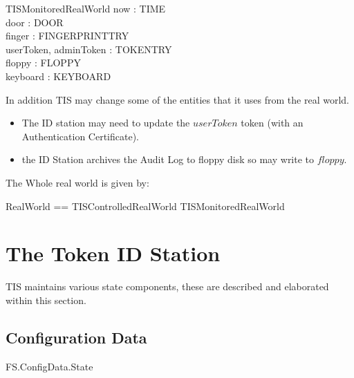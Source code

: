 \begin{schema}{TISMonitoredRealWorld}
        now : TIME
\\      door : DOOR
\\      finger : FINGERPRINTTRY
\\      userToken, adminToken : TOKENTRY
\\      floppy : FLOPPY
\\      keyboard : KEYBOARD
\end{schema}

In addition TIS may change some of the entities that it uses from the
real world.   
\begin{itemize}
\item The ID station may need to update the $userToken$ token
(with an Authentication Certificate).
\item the ID Station archives the Audit Log to floppy disk so may
write to $floppy$.
\end{itemize}


The Whole real world is given by:
\begin{zed}
RealWorld == TISControlledRealWorld \land TISMonitoredRealWorld
\end{zed}
\chapter{The Token ID Station}
\label{sec:TIS}
TIS maintains various state components, these are described and
elaborated within this section. 

\section{Configuration Data}

\begin{traceunit}{FS.ConfigData.State}
\end{traceunit}


